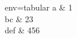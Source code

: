 \documentclass{article}
\begin{document}
\begin{tableobject}{env=tabular}
	\toprule
	a   & 1   \\
	bc  & 23  \\
	def & 456 \\
	\bottomrule
\end{tableobject}
\end{document}
